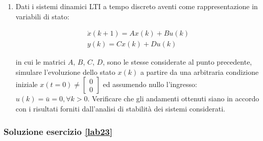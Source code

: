 \documentclass[../main.tex]{subfiles}
\begin{document}
\begin{enumerate}
		Simulare l'evoluzione dello stato $x(t)$ a partire da una arbitraria condizione iniziale $x(t = 0) \neq \begin{bmatrix}0\\0\end{bmatrix}$ ed assumendo nullo l'ingresso: $u(t) = \bar u = 0, \forall t > 0.$ Virificare che gli andamenti ottenuti siano in accordo con i risultati forniti dall'analisi di stabilità dei sistemi considerati.
		
	\item Dati i sistemi dinamici LTI  a tempo discreto aventi come rappresentazione in variabili di stato:

		\begin{equation}
		\begin{split}
			\dot x(k+1) = Ax(k) + Bu(k) \\
			y(k) = Cx(k) + Du(k)
		\end{split}	
		\end{equation}
		
		in cui le matrici $A$, $B$, $C$, $D$, sono le stesse considerate al punto precedente, simulare l'evoluzione dello stato $x(k)$ a partire da una arbitraria condizione iniziale $x(t=0) \neq \begin{bmatrix}0\\0\end{bmatrix}$ ed assumendo nullo l'ingresso: $u(k) = \bar u = 0, \forall k > 0$. Verificare che gli andamenti ottenuti siano in accordo con i risultati forniti dall'analisi di stabilità dei sistemi considerati.
	 
	
			
\end{enumerate}

\subsubsection*{Soluzione esercizio \ref{lab23}}
\end{document}
